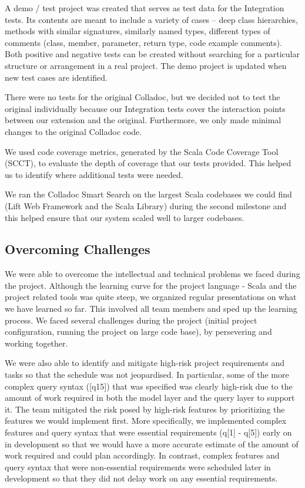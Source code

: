 A demo / test project was created that serves as test data for the Integration tests. Its contents are meant to include a variety of cases – deep class hierarchies, methods with similar signatures, similarly named types, different types of comments (class, member, parameter, return type, code example comments). Both positive and negative tests can be created without searching for a particular structure or arrangement in a real project. The demo project is updated when new test cases are identified.

There were no tests for the original Colladoc, but we decided not to test the original individually because our Integration tests cover the interaction points between our extension and the original. Furthermore, we only made minimal changes to the original Colladoc code.

We used code coverage metrics, generated by the Scala Code Coverage Tool (SCCT), to evaluate the depth of coverage that our tests provided. This helped us to identify where additional tests were needed.

We ran the Colladoc Smart Search on the largest Scala codebases we could find (Lift Web Framework and the Scala Library) during the second milestone and this helped ensure that our system scaled well to larger codebases.
\subsection{Overcoming Challenges}

We were able to overcome the intellectual and technical problems we faced during the project. Although the learning curve for the project language - Scala and the project related tools was quite steep, we organized regular presentations on what we have learned so far. This involved all team members and sped up the learning process. 
We faced several challenges during the project (initial project configuration, running the project on large code base), by persevering and working together.

We were also able to identify and mitigate high-risk project requirements and tasks so that the schedule was not jeopardised. In particular, some of the more complex query syntax ([q15]) that was specified was clearly high-risk due to the amount of work required in both the model layer and the query layer to support it. The team mitigated the risk posed by high-risk features by prioritizing the features we would implement first. More specifically, we implemented complex features and query syntax that were essential requirements (q[1] - q[5])  early on in development so that we would have a more accurate estimate of the amount of work required and could plan accordingly. In contrast, complex features and query syntax that were non-essential requirements were scheduled later in development so that they did not delay work on any essential requirements.

